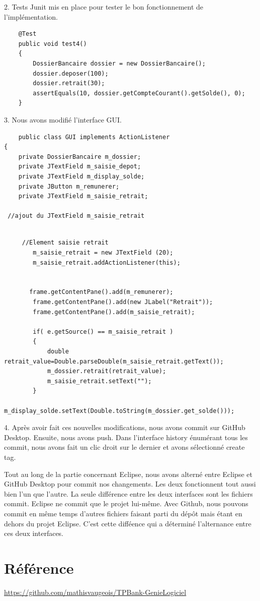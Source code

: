 \documentclass{article}
\begin{document}
2.
Tests Junit mis en place pour tester le bon fonctionnement de l'implémentation.

\begin{lstlisting}
    @Test  
	public void test4()
	{
		DossierBancaire dossier = new DossierBancaire();
		dossier.deposer(100);
		dossier.retrait(30);
		assertEquals(10, dossier.getCompteCourant().getSolde(), 0);
	}
\end{lstlisting}

3.
Nous avons modifié l'interface GUI.

\begin{lstlisting}
    public class GUI implements ActionListener 
{
	private DossierBancaire m_dossier;
	private JTextField m_saisie_depot;
	private JTextField m_display_solde;
	private JButton m_remunerer;
	private JTextField m_saisie_retrait;

 //ajout du JTextField m_saisie_retrait
	
\end{lstlisting}
\begin{lstlisting}
     //Element saisie retrait
        m_saisie_retrait = new JTextField (20);
        m_saisie_retrait.addActionListener(this);


       frame.getContentPane().add(m_remunerer); 
        frame.getContentPane().add(new JLabel("Retrait"));
        frame.getContentPane().add(m_saisie_retrait);

        if( e.getSource() == m_saisie_retrait )
    	{
    		double retrait_value=Double.parseDouble(m_saisie_retrait.getText());
    		m_dossier.retrait(retrait_value);
    		m_saisie_retrait.setText("");
    	}
    	m_display_solde.setText(Double.toString(m_dossier.get_solde())); 
\end{lstlisting}

4. Après avoir fait ces nouvelles modifications, nous avons commit sur GitHub Desktop. Ensuite, nous avons push. Dans l'interface history énumérant tous les commit, nous avons fait un clic droit sur le dernier et avons sélectionné create tag.

Tout au long de la partie concernant Eclipse, nous avons alterné entre Eclipse et GitHub Desktop pour commit nos changements. Les deux fonctionnent tout aussi bien l'un que l'autre. La seule différence entre les deux interfaces sont les fichiers commit. Eclipse ne commit que le projet lui-même. Avec Github, nous pouvons commit en même temps d'autres fichiers faisant parti du dépôt mais étant en dehors du projet Eclipse. C'est cette difféence qui a déterminé l'alternance entre ces deux interfaces.
\section*{Référence}




\url{https://github.com/mathisvaugeois/TPBank-GenieLogiciel}
\end{document}
